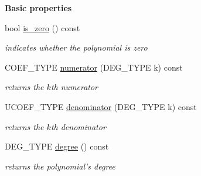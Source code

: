 \begin{Indent}\textbf{ Basic properties}\par
\begin{DoxyCompactItemize}
\item 
\mbox{\label{class_dense___univariate___rational___polynomial_a6959dd2fd63384953e774e63c1e2a344}} 
bool \hyperlink{class_dense___univariate___rational___polynomial_a6959dd2fd63384953e774e63c1e2a344}{is\+\_\+zero} () const
\begin{DoxyCompactList}\small\item\em indicates whether the polynomial is zero \end{DoxyCompactList}\item 
\mbox{\label{class_dense___univariate___rational___polynomial_a660686fcb8d2f6c874eea7ccb9ad127b}} 
C\+O\+E\+F\+\_\+\+T\+Y\+PE \hyperlink{class_dense___univariate___rational___polynomial_a660686fcb8d2f6c874eea7ccb9ad127b}{numerator} (D\+E\+G\+\_\+\+T\+Y\+PE k) const
\begin{DoxyCompactList}\small\item\em returns the $k$th numerator \end{DoxyCompactList}\item 
\mbox{\label{class_dense___univariate___rational___polynomial_a409c8de55599ce76d63a48d37a4dc41e}} 
U\+C\+O\+E\+F\+\_\+\+T\+Y\+PE \hyperlink{class_dense___univariate___rational___polynomial_a409c8de55599ce76d63a48d37a4dc41e}{denominator} (D\+E\+G\+\_\+\+T\+Y\+PE k) const
\begin{DoxyCompactList}\small\item\em returns the $k$th denominator \end{DoxyCompactList}\item 
\mbox{\label{class_dense___univariate___rational___polynomial_a12c3fe334fa0eefdc2533bad00df262d}} 
D\+E\+G\+\_\+\+T\+Y\+PE \hyperlink{class_dense___univariate___rational___polynomial_a12c3fe334fa0eefdc2533bad00df262d}{degree} () const
\begin{DoxyCompactList}\small\item\em returns the polynomial's degree \end{DoxyCompactList}\item 

\end{DoxyCompactItemize}
\end{Indent}
